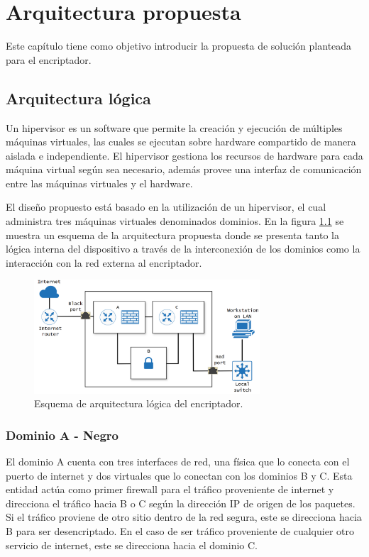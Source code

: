 \chapter{Arquitectura propuesta}

Este capítulo tiene como objetivo introducir la propuesta de solución planteada para el encriptador.

\section{Arquitectura lógica}

Un hipervisor es un software que permite la creación y ejecución de múltiples máquinas virtuales, las cuales se ejecutan sobre hardware compartido de manera aislada e independiente. El hipervisor gestiona los recursos de hardware para cada máquina virtual según sea necesario, además provee una interfaz de comunicación entre las máquinas virtuales y el hardware.

El diseño propuesto está basado en la utilización de un hipervisor, el cual administra tres máquinas virtuales denominados dominios. En la figura \ref{fig:arquitectura_logica} se muestra un esquema de la arquitectura propuesta donde se presenta tanto la lógica interna del dispositivo a través de la interconexión de los dominios como la interacción con la red externa al encriptador.

\begin{figure}[h!]
    \centering
    \includegraphics[width=0.75\textwidth]{../figs/2_arquitectura_logica.png}
    \caption{Esquema de arquitectura lógica del encriptador.}
    \label{fig:arquitectura_logica}
\end{figure}


\subsection{Dominio A - Negro}
El dominio A cuenta con tres interfaces de red, una física que lo conecta con el puerto de internet y dos virtuales que lo conectan con los dominios B y C.
Esta entidad actúa como primer firewall para el tráfico proveniente de internet y direcciona el tráfico hacia B o C según la dirección IP de origen de los paquetes. Si el tráfico proviene de otro sitio dentro de la red segura, este se direcciona hacia B para ser desencriptado. En el caso de ser tráfico proveniente de cualquier otro servicio de internet, este se direcciona hacia el dominio C.

